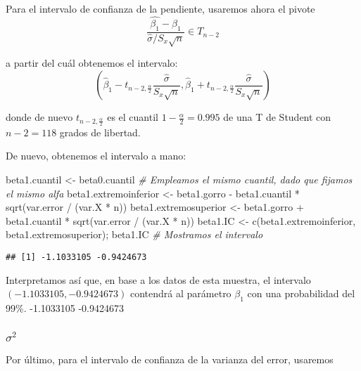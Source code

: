 \documentclass[
]{article}
\newenvironment{Shaded}{\begin{snugshade}}{\end{snugshade}}
\newcommand{\CommentTok}[1]{\textcolor[rgb]{0.56,0.35,0.01}{\textit{#1}}}
\newcommand{\FunctionTok}[1]{\textcolor[rgb]{0.00,0.00,0.00}{#1}}
\newcommand{\NormalTok}[1]{#1}
\newcommand{\OtherTok}[1]{\textcolor[rgb]{0.56,0.35,0.01}{#1}}
\newcommand{\SpecialCharTok}[1]{\textcolor[rgb]{0.00,0.00,0.00}{#1}}
\begin{document}
Para el intervalo de confianza de la pendiente, usaremos ahora el pivote
\[
\frac{\hat{\beta_1} - \beta_1}{\hat\sigma / {S_x \sqrt{n}}} \in T_{n-2}
\]

a partir del cuál obtenemos el intervalo: \[
(\hat\beta_1 - t_{n-2, \frac{\alpha}{2}}\frac{\hat{\sigma}}{S_x \sqrt{n}}, \hat\beta_1 + t_{n-2, \frac{\alpha}{2}}\frac{\hat\sigma}{S_x \sqrt{n}})
\]

donde de nuevo \(t_{n-2,\frac{\alpha}{2}}\) es el cuantil
\(1-\frac{\alpha}{2} = 0.995\) de una T de Student con \(n-2= 118\)
grados de libertad.

De nuevo, obtenemos el intervalo a mano:

\begin{Shaded}
\begin{Highlighting}[]
\NormalTok{beta1.cuantil }\OtherTok{\textless{}{-}}\NormalTok{ beta0.cuantil      }\CommentTok{\# Empleamos el mismo cuantil, dado que fijamos el mismo alfa}
\NormalTok{beta1.extremoinferior }\OtherTok{\textless{}{-}}\NormalTok{ beta1.gorro }\SpecialCharTok{{-}}\NormalTok{ beta1.cuantil }\SpecialCharTok{*} \FunctionTok{sqrt}\NormalTok{(var.error }\SpecialCharTok{/}\NormalTok{ (var.X }\SpecialCharTok{*}\NormalTok{ n))}
\NormalTok{beta1.extremosuperior }\OtherTok{\textless{}{-}}\NormalTok{ beta1.gorro }\SpecialCharTok{+}\NormalTok{ beta1.cuantil }\SpecialCharTok{*} \FunctionTok{sqrt}\NormalTok{(var.error }\SpecialCharTok{/}\NormalTok{ (var.X }\SpecialCharTok{*}\NormalTok{ n))}
\NormalTok{beta1.IC }\OtherTok{\textless{}{-}} \FunctionTok{c}\NormalTok{(beta1.extremoinferior, beta1.extremosuperior); beta1.IC   }\CommentTok{\# Mostramos el intervalo}
\end{Highlighting}
\end{Shaded}

\begin{verbatim}
## [1] -1.1033105 -0.9424673
\end{verbatim}

Interpretamos así que, en base a los datos de esta muestra, el intervalo
\((-1.1033105, -0.9424673)\) contendrá al parámetro \(\beta_1\) con una
probabilidad del 99\%. -1.1033105 -0.9424673

\hypertarget{sigma2}{%
\subsubsection{\texorpdfstring{\(\sigma^2\)}{\textbackslash sigma\^{}2}}\label{sigma2}}

Por último, para el intervalo de confianza de la varianza del error,
usaremos
\end{document}
